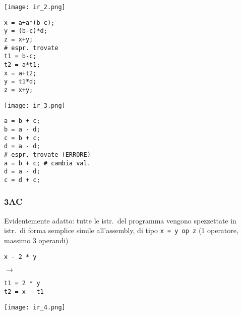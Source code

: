 \begin{example}[frametitle={Esempi}]
   \noindent\begin{minipage}[c]{.2\textwidth}
   \texttt{[image: ir\_2.png]}
   \end{minipage}
   \begin{minipage}[c]{.23\textwidth}
      \begin{lstlisting}
x = a+a*(b-c);
y = (b-c)*d;
z = x+y;
# espr. trovate
t1 = b-c;
t2 = a*t1;
x = a+t2;
y = t1*d;
z = x+y;\end{lstlisting}
   \end{minipage}\hfill\vline
   \begin{minipage}[c]{.2\textwidth}
   \texttt{[image: ir\_3.png]}
   \end{minipage}
   \begin{minipage}[c]{.35\textwidth}
      \begin{lstlisting}
a = b + c;
b = a - d;
c = b + c;
d = a - d;
# espr. trovate (ERRORE)
a = b + c; # cambia val.
d = a - d;
c = d + c;\end{lstlisting}
   \end{minipage}
\end{example}



\subsubsection{3AC}


\begin{minipage}[c]{.65\textwidth}
Evidentemente adatto: tutte le istr.~del programma vengono spezzettate in istr.~di forma semplice simile all'assembly, di tipo \lstinline|x = y op z| (1 operatore, massimo 3 operandi)

\noindent
  \begin{minipage}[c]{.3\textwidth}
    \begin{lstlisting}
x - 2 * y\end{lstlisting}
  \end{minipage}
  $\rightarrow$
  \begin{minipage}[c]{.32\textwidth}
    \begin{lstlisting}
t1 = 2 * y
t2 = x - t1\end{lstlisting}
  \end{minipage}
\end{minipage}
  \hfill
  \begin{minipage}[c]{.3\textwidth}
  \texttt{[image: ir\_4.png]}
  \end{minipage}

